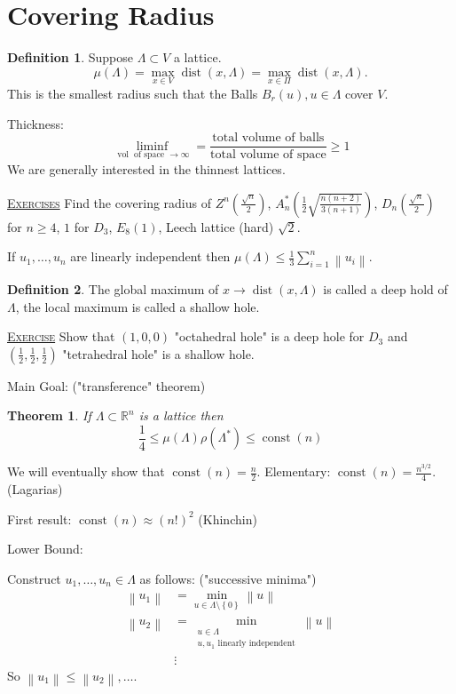 \documentclass{report}
\newcommand{\R}{\mathbb{R}}
\def \dist {\operatorname{dist}}
\def \dist {\operatorname{dist}}
\newcommand{\vol}{\operatorname{vol}}
\newcommand{\norm}[1]{\left\| #1 \right\|}
\newcommand{\set}[1]{\left\{ #1 \right\}}
\newcommand{\fancyem}[1]{\underline{\textsc{#1}}}
\newtheorem{theorem}{Theorem}[section]
\theoremstyle{definition}
\newtheorem{definition}{Definition}[section]
\theoremstyle{remark}
\numberwithin{equation}{section}
\begin{document}
\section{Covering Radius}
\begin{definition}
    Suppose $\Lambda \subset V$ a lattice. \[\mu(\Lambda) = \max_{x \in V} \dist(x, \Lambda) = \max_{x \in \Pi} \dist(x, \Lambda).\] This is the smallest radius such that the Balls $B_r(u), u \in \Lambda$ cover $V$.
\end{definition}

Thickness:
\[
    \liminf_{\vol \text{ of space } \to \infty} = \frac{\text{total volume of balls}}{\text{total volume of space}} \geq 1    
\]
We are generally interested in the thinnest lattices.

\fancyem{Exercises}
Find the covering radius of $Z^n \left(\frac{\sqrt{n}}{2}\right)$, $A_n^* \left(\frac{1}{2}\sqrt{\frac{n(n+2)}{3(n+1)}}\right)$, $D_n \left(\frac{\sqrt{n}}{2}\right)$ for $n \geq 4$, $1$ for $D_3$, $E_8 (1)$, Leech lattice (hard) $\sqrt{2}$.

If $u_1, \ldots, u_n$ are linearly independent then $\mu(\Lambda) \leq \frac{1}{3}\sum_{i=1}^n\norm{u_i}$.

\begin{definition}
    The global maximum of $x \to \dist(x, \Lambda)$ is called a deep hold of $\Lambda$, the local maximum is called a shallow hole.
\end{definition}

\fancyem{Exercise} Show that $(1, 0, 0)$ "octahedral hole" is a deep hole for $D_3$ and $\left(\frac{1}{2},\frac{1}{2},\frac{1}{2}\right)$ "tetrahedral hole" is a shallow hole.

Main Goal: ("transference" theorem)
\begin{theorem}
    If $\Lambda \subset \R^n$ is a lattice then \[\frac{1}{4} \leq \mu(\Lambda)\rho(\Lambda^*)\leq \operatorname{const}(n)\]
\end{theorem}
We will eventually show that $\operatorname{const}(n) = \frac{n}{2}$.
Elementary: $\operatorname{const}(n) = \frac{n^{3/2}}{4}$. (Lagarias)

First result: $\operatorname{const}(n) \approx (n!)^2$ (Khinchin)

Lower Bound:

Construct $u_1, \ldots, u_n \in \Lambda$ as follows: ("successive minima")
\begin{align*}
    \norm{u_1} & = \min_{u \in \Lambda \setminus \set{0}}\norm{u} \\
    \norm{u_2} & = \min_{\substack{u \in \Lambda \\ u, u_1 \text{ linearly independent}}} \norm{u} \\
    & \vdots
\end{align*}
So $\norm{u_1} \leq \norm{u_2}, \ldots$.
\end{document}
